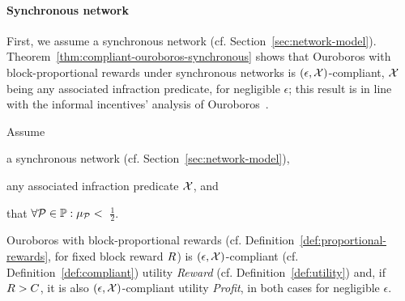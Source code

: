 \paragraph{Synchronous network}
First, we assume a synchronous network (cf.
Section~\ref{sec:network-model}).
Theorem~\ref{thm:compliant-ouroboros-synchronous} shows that Ouroboros with
block-proportional rewards under synchronous networks is $(\epsilon,\mathcal{X})$-compliant, $\mathcal{X}$ being any associated infraction predicate, for negligible $\epsilon$; this result is in line with the informal
incentives' analysis of Ouroboros~\cite{C:KRDO17}.

\begin{theorem}\label{thm:compliant-ouroboros-synchronous}
    Assume
    \begin{inparaenum}[i)]
        \item a synchronous network (cf.
            Section~\ref{sec:network-model}),
        \item any associated infraction predicate $\mathcal{X}$, and
        \item that $\forall \mathcal{P} \in \mathbb{P}: \mu_{\mathcal{P}} <$~$\frac{1}{2}$.
    \end{inparaenum}
    Ouroboros with block-proportional rewards (cf.
    Definition~\ref{def:proportional-rewards}, for fixed block reward $R$) is $(\epsilon, \mathcal{X})$-compliant (cf.
    Definition~\ref{def:compliant}) \wrt utility \emph{Reward} (cf.
    Definition~\ref{def:utility}) and,
    if $R > C$, it is also $(\epsilon, \mathcal{X})$-compliant
    \wrt utility \emph{Profit}, in both cases for negligible $\epsilon$.
\end{theorem}
